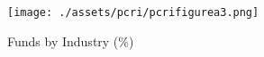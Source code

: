 
\begin{figure}[tb]
    \centering
\texttt{[image: ./assets/pcri/pcrifigurea3.png]}
\caption{Funds by Industry (\%)\label{fig:pcrifigurea3}}
\end{figure}
